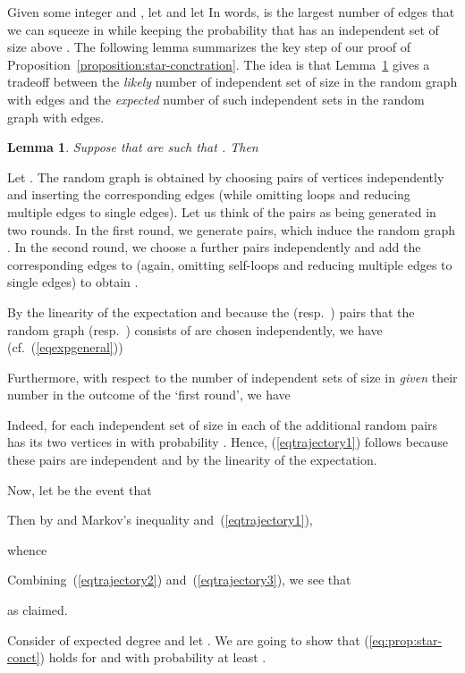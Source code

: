 \documentclass[a4paper,10pt]{article}
\makeatletter
\newtheorem{lemma}{Lemma}\renewcommand{\thelemma}{\arabic{lemma}}
\newenvironment{proof}{\noindent{\bf Proof\@:}}{\hfill \\}
\newcommand\Lem{Lemma}
\newcommand\Prop{Proposition}
\makeatother
\begin{document}
Given some integer  and , let 	
and let 		
In words,  is the largest number of edges that we can squeeze
in while keeping the probability that   has an independent
set of size  above . The following lemma summarizes the key
step of our proof of \Prop~\ref{proposition:star-conctration}. The
idea is that \Lem~\ref{lemma:concentration-1} gives a tradeoff
between the \emph{likely} number of independent set of size 
in the random graph with  edges and the \emph{expected}
number of such independent sets in the random graph with 
edges.

\begin{lemma}\label{lemma:concentration-1}
Suppose that  are such that . Then

\end{lemma}
\begin{proof}
Let . The random graph  is obtained by choosing
 pairs of vertices independently	and inserting the corresponding
edges (while omitting loops and reducing multiple edges to single edges).
Let us think of the  pairs as being generated in two rounds.
In the first round, we generate  pairs, which induce the
random graph . In the second round, we choose a
further  pairs independently and add the corresponding edges
to  (again, omitting self-loops and reducing multiple edges
to single edges) to obtain .

By the linearity of the expectation and because the  (resp.\ )
pairs that the random graph  (resp.\ ) consists of are
chosen independently, we have  (cf.~(\ref{eqexpgeneral}))
	
Furthermore, with respect to the 	number of independent sets of
size  in  \emph{given} their number in the outcome 
of the `first round', we have
	
Indeed, for each independent set  of size  in  each of
the  additional random pairs has its two vertices in  with
probability . Hence, (\ref{eqtrajectory1}) follows because
these  pairs are independent and by the linearity of the expectation.

\noindent
Now, let  be the event that
	
Then by and Markov's inequality and~(\ref{eqtrajectory1}),
	
whence
	
Combining~(\ref{eqtrajectory2}) and~(\ref{eqtrajectory3}), we see that
	
as claimed.
\end{proof}


\noindent{\bf Proof of \Prop~\ref{proposition:star-conctration}.}
Consider  of expected degree  and let . We are going to 
show that (\ref{eq:prop:star-conct}) holds for  and
 with probability at least .
\end{document}
